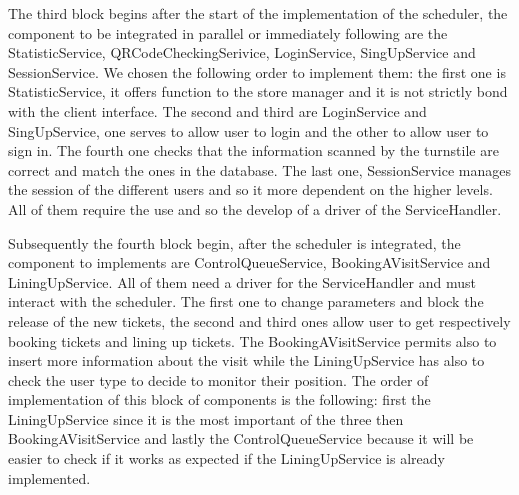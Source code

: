 The third block begins after the start of the implementation of the scheduler, the component to be integrated in parallel or immediately following are the StatisticService, QRCodeCheckingSerivice, LoginService, SingUpService and SessionService.
We chosen the following order to implement them:
the first one is StatisticService, it offers function to the store manager and it is not strictly bond with the client interface. The second and third are LoginService and SingUpService, one serves to allow user to login and the other to allow user to sign in. The fourth one checks that the information scanned by the turnstile are correct and match the ones in the database. The last one, SessionService manages the session of the different users and so it more dependent on the higher levels. All of them require the use and so the develop of a driver of the ServiceHandler.

Subsequently the fourth block begin, after the scheduler is integrated, the component to implements are ControlQueueService, BookingAVisitService and LiningUpService. All of them need a driver for the ServiceHandler and must interact with the scheduler. The first one to change parameters and block the release of the new tickets, the second and third ones allow user to get respectively booking tickets and lining up tickets. The BookingAVisitService permits also to insert more information about the visit while the LiningUpService has also to check the user type to decide to monitor their position. The order of implementation of this block of components is the following: first the LiningUpService since it is the most important of the three then BookingAVisitService and lastly the ControlQueueService because it will be easier to check if it works as expected if the LiningUpService is already implemented.

